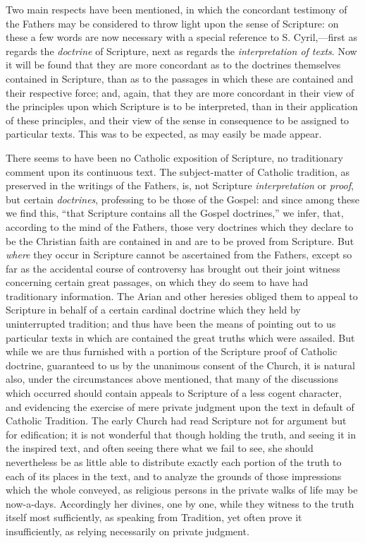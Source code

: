 Two main respects have been
mentioned, in which the concordant testimony of the Fathers may be
considered to throw light upon the sense of Scripture: on these a few
words are now necessary with a special reference to S. Cyril,—first
as regards the \emph{doctrine} of Scripture, next as regards the \emph{interpretation
of texts}. Now it will be found that they are more concordant as to
the doctrines themselves contained in Scripture, than as to the
passages in which these are contained and their respective force; and,
again, that they are more concordant in their view of the principles
upon which Scripture is to be interpreted, than in their application
of these principles, and their view of the sense in consequence to be
assigned to particular texts. This was to be expected, as may easily
be made appear.

There seems to have been no
Catholic exposition of Scripture, no traditionary comment upon its
continuous text. The subject-matter of Catholic tradition, as
preserved in the writings of the Fathers, is, not Scripture \emph{interpretation}
or \emph{proof}, but certain \emph{doctrines}, professing to be those
of the Gospel: and since among these we find this, ``that Scripture
contains all the Gospel doctrines,'' we infer, that, according to the
mind of the Fathers, those very doctrines which they declare to be the
Christian faith are contained in and are to be proved from Scripture.
But \emph{where} they occur in Scripture cannot be ascertained from
the Fathers, except so far as the accidental course of controversy has
brought out their joint witness concerning certain great
passages, on which they do seem to have had traditionary information.
The Arian and other heresies obliged them to appeal to Scripture in
behalf of a certain cardinal doctrine which they held by uninterrupted
tradition; and thus have been the means of pointing out to us
particular texts in which are contained the great truths which were
assailed. But while we are thus furnished with a portion of the
Scripture proof of Catholic doctrine, guaranteed to us by the
unanimous consent of the Church, it is natural also, under the
circumstances above mentioned, that many of the discussions which
occurred should contain appeals to Scripture of a less cogent
character, and evidencing the exercise of mere private judgment upon
the text in default of Catholic Tradition. The early Church had read
Scripture not for argument but for edification; it is not wonderful
that though holding the truth, and seeing it in the inspired text, and
often seeing there what we fail to see, she should nevertheless be as
little able to distribute exactly each portion of the truth to each of
its places in the text, and to analyze the grounds of those
impressions which the whole conveyed, as religious persons in the
private walks of life may be now-a-days. Accordingly her divines, one
by one, while they witness to the truth itself most sufficiently, as
speaking from Tradition, yet often prove it insufficiently, as relying
necessarily on private judgment.

